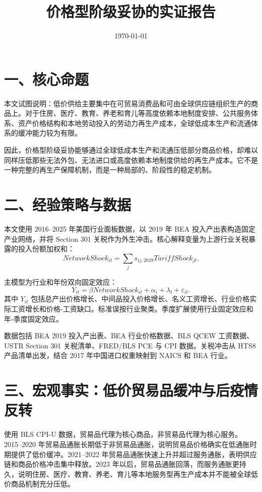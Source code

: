 \documentclass[11pt]{ctexart}
\title{价格型阶级妥协的实证报告}
\author{}
\date{\today}
\begin{document}
\maketitle

\section*{一、核心命题}

本文试图说明：低价供给主要集中在可贸易消费品和可由全球供应链组织生产的商品上。对于住房、医疗、教育、养老和育儿等高度依赖本地制度安排、公共服务体系、资产价格结构和本地劳动投入的劳动力再生产成本，全球低成本生产和流通体系的缓冲能力较为有限。

因此，价格型阶级妥协能够通过全球低成本生产和流通压低部分商品价格，却难以同样压低那些无法外包、无法进口或高度依赖本地制度供给的再生产成本。它不是一种完整的再生产保障机制，而是一种局部的、阶段性的稳定机制。

\section*{二、经验策略与数据}

本文使用 2016--2025 年美国行业面板数据，以 2019 年 BEA 投入产出表构造固定产业网络，并将 Section 301 关税作为外生冲击。核心解释变量为上游行业关税暴露的投入份额加权和：
\[
NetworkShock_{it}=\sum_j s_{ij,2019}TariffShock_{jt}.
\]

主模型为行业和年份双向固定效应：
\[
Y_{it}=\beta NetworkShock_{it}+\alpha_i+\lambda_t+\varepsilon_{it}.
\]
其中 \(Y_{it}\) 包括总产出价格增长、中间品投入价格增长、名义工资增长、行业价格实际工资增长和价格-工资缺口。标准误按行业聚类。季度扩展使用行业固定效应和年-季度固定效应。

数据包括 BEA 2019 投入产出表、BEA 行业价格数据、BLS QCEW 工资数据、USTR Section 301 关税清单、FRED/BLS PCE 与 CPI 数据。关税冲击从 HTS8 产品清单出发，结合 2017 年中国进口权重映射到 NAICS 和 BEA 行业。

\section*{三、宏观事实：低价贸易品缓冲与后疫情反转}

使用 BLS CPI-U 数据，贸易品代理为核心商品，非贸易品代理为核心服务。2015--2020 年贸易品通胀长期低于非贸易品通胀，说明贸易品价格确实在低通胀时期提供了低价缓冲。2021--2022 年贸易品通胀快速上升并超过服务通胀，表明供应链和商品价格冲击集中释放。2023 年以后，贸易品通胀回落，而服务通胀更持久，说明住房、医疗、教育、养老、育儿等本地服务型再生产成本并不能被全球低价商品机制充分压低。
\end{document}
